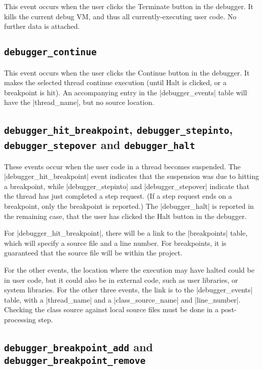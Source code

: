 \documentclass{book}
\begin{document}
This event occurs when the user clicks the Terminate button in the debugger.
It kills the current debug VM, and thus all currently-executing user code.  No
further data is attached.

\subsection{\lstinline|debugger_continue|}

This event occurs when the user clicks the Continue button in the debugger.
It makes the selected thread continue execution (until Halt is clicked, or a
breakpoint is hit).  An accompanying entry in the |debugger_events| table will
have the |thread_name|, but no source location.

\subsection{\lstinline|debugger_hit_breakpoint|,
  \lstinline|debugger_stepinto|, \lstinline|debugger_stepover| and
  \lstinline|debugger_halt|}

These events occur when the user code in a thread becomes suspended.  The
|debugger_hit_breakpoint| event indicates that the suspension was due to
hitting a breakpoint, while |debugger_stepinto| and |debugger_stepover|
indicate that the thread has just completed a step request.  (If a step
request ends on a breakpoint, only the breakpoint is reported.)  The
|debugger_halt| is reported in the remaining case, that the user has
clicked the Halt button in the debugger.

For |debugger_hit_breakpoint|, there will be a link to the |breakpoints|
table, which will specify a source file and a line number.  For breakpoints,
it is guaranteed that the source file will be within the project.

For the other events, the location where the execution may have halted could
be in user code, but it could also be in external code, such as user
libraries, or system libraries.  For the other three events, the link is to
the |debugger_events| table, with a |thread_name| and a |class_source_name|
and |line_number|.  Checking the class source against local source files must
be done in a post-processing step.


\subsection{\lstinline|debugger_breakpoint_add| and
  \lstinline|debugger_breakpoint_remove|}
\end{document}
